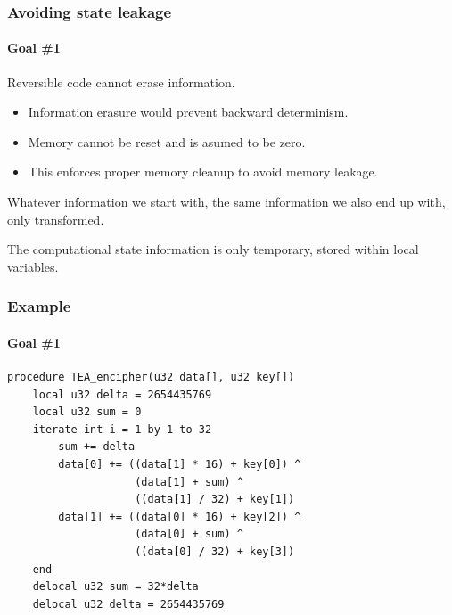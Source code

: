 \documentclass{beamer}
\begin{document}
\addtocounter{page}{1}
\begin{frame}
\addtocounter{page}{-1}
\frametitle{Avoiding state leakage}
\framesubtitle{\hspace{5mm}Goal \#1} 

\pause
\begin{block}{Reversible code cannot erase information.}
\begin{itemize}
\item Information erasure would prevent backward determinism.
\item Memory cannot be reset and is asumed to be zero.
\item This enforces proper memory cleanup to avoid memory leakage.
\end{itemize}
\end{block}

\pause

Whatever information we start with, the same information we also end up 
with, only transformed. 

\pause 
The computational state information is only temporary, stored within local variables.

\end{frame}


\addtocounter{page}{1}
\begin{frame}[fragile]
\addtocounter{page}{-1}
\frametitle{Example}
\framesubtitle{\hspace{5mm}Goal \#1} 

\begin{lstlisting}[language=Janus]
procedure TEA_encipher(u32 data[], u32 key[])
    local u32 delta = 2654435769
    local u32 sum = 0
    iterate int i = 1 by 1 to 32
        sum += delta
        data[0] += ((data[1] * 16) + key[0]) ^
                    (data[1] + sum) ^
                    ((data[1] / 32) + key[1])
        data[1] += ((data[0] * 16) + key[2]) ^
                    (data[0] + sum) ^
                    ((data[0] / 32) + key[3])
    end
    delocal u32 sum = 32*delta
    delocal u32 delta = 2654435769
\end{lstlisting}


\end{frame}
\end{document}
